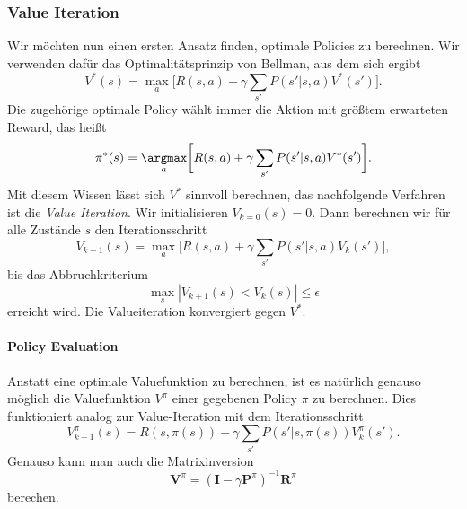 \documentclass[ngerman]{../LaTeX-Templates/Paper/paper}
\begin{document}
\subsubsection{Value Iteration}
Wir möchten nun einen ersten Ansatz finden, optimale Policies zu berechnen.
Wir verwenden dafür das Optimalitätsprinzip von Bellman, aus dem sich ergibt
\begin{equation*}
	V^\ast(s)=\max_a\bigg[R(s,a)+\gamma\sum_{s'}P(s'|s,a)V^\ast(s')\bigg].
\end{equation*}
Die zugehörige optimale Policy wählt immer die Aktion mit größtem erwarteten Reward, das heißt
\begin{equation*}
	\pi^\ast(s)=\underset a\argmax \bigg[R(s,a)+\gamma\sum_{s'}P(s'|s,a)V^\ast(s')\bigg].
\end{equation*}
Mit diesem Wissen lässt sich $V^\ast$ sinnvoll berechnen, das nachfolgende Verfahren ist die \emph{Value Iteration}.
Wir initialisieren $V_{k=0}(s)=0$. Dann berechnen wir für alle Zustände $s$ den Iterationsschritt
\begin{equation*}
	V_{k+1}(s)=\max_a\bigg[R(s,a)+\gamma\sum_{s'}P(s'|s,a)V_k(s')\bigg],
\end{equation*} 
bis das Abbruchkriterium
\begin{equation*}
	\max_s|V_{k+1}(s)<V_k(s)|\leq \epsilon
\end{equation*}
erreicht wird.
Die Valueiteration konvergiert gegen $V^\ast$.

\paragraph{Policy Evaluation}\label{policyEvaluation}
Anstatt eine optimale Valuefunktion zu berechnen, ist es natürlich genauso möglich die Valuefunktion $V^\pi$ einer gegebenen Policy $\pi$ zu berechnen. Dies funktioniert analog zur Value-Iteration mit dem Iterationsschritt
\begin{equation*}
	V_{k+1}^\pi(s)=R(s,\pi(s))+\gamma\sum_{s'}P(s'|s,\pi(s))V_k^\pi(s').
\end{equation*}
Genauso kann man auch die Matrixinversion
\begin{equation*}
	\mathbf V^\pi=(\mathbf I-\gamma\mathbf P^\pi)^{-1}\mathbf R^\pi
\end{equation*}
berechen.
\end{document}
